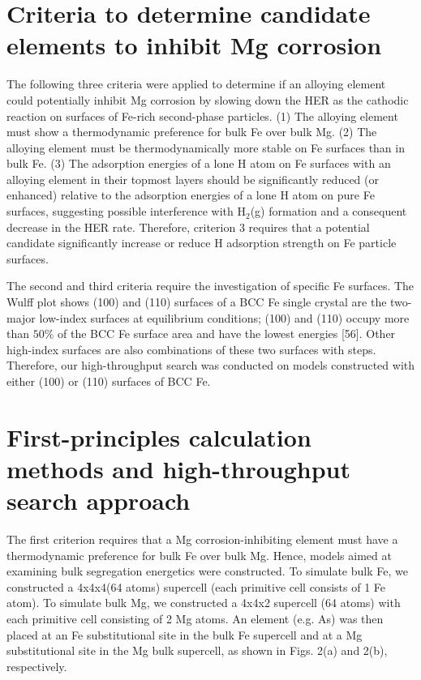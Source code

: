 \section{Criteria to determine candidate elements to inhibit Mg corrosion}
\label{chap:Mg_H:sec:criteria}

The following three criteria were applied to determine if an alloying element could potentially inhibit Mg corrosion by slowing down the \ac{HER} as the cathodic reaction on surfaces of Fe-rich second-phase particles. (1) The alloying element must show a thermodynamic preference for bulk Fe over bulk Mg. (2) The alloying element must be thermodynamically more stable on Fe surfaces than in bulk Fe. (3) The adsorption energies of a lone H atom on Fe surfaces with an alloying element in their topmost layers should be significantly reduced (or enhanced) relative to the adsorption energies of a lone H atom on pure Fe surfaces, suggesting possible interference with $\text{H}_2$(g) formation and a consequent decrease in the \ac{HER} rate. Therefore, criterion 3 requires that a potential candidate significantly increase or reduce H adsorption strength on Fe particle surfaces. 

The second and third criteria require the investigation of specific Fe surfaces. The Wulff plot shows (100) and (110) surfaces of a \ac{BCC} Fe single crystal are the two-major low-index surfaces at equilibrium conditions; (100) and (110) occupy more than $\text{50}\%$ of the \ac{BCC} Fe surface area and have the lowest energies [56]. Other high-index surfaces are also combinations of these two surfaces with steps. Therefore, our high-throughput search was conducted on models constructed with either (100) or (110) surfaces of \ac{BCC} Fe.  

\section{First-principles calculation methods and high-throughput search approach}
\label{chap:Mg_H:sec:calculation}

The first criterion requires that a Mg corrosion-inhibiting element must have a thermodynamic preference for bulk Fe over bulk Mg. Hence, models aimed at examining bulk segregation energetics were constructed. To simulate bulk Fe, we constructed a 4x4x4(64 atoms) supercell (each primitive cell consists of 1 Fe atom). To simulate bulk Mg, we constructed a 4x4x2 supercell (64 atoms) with each primitive cell consisting of 2 Mg atoms. An element (e.g. As) was then placed at an Fe substitutional site in the bulk Fe supercell and at a Mg substitutional site in the Mg bulk supercell, as shown in Figs. 2(a) and 2(b), respectively.

